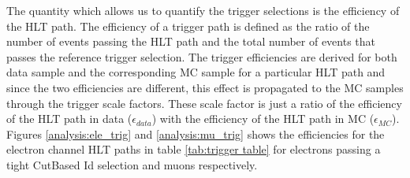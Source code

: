 The quantity which allows us to quantify the trigger selections is the efficiency of the HLT path. The efficiency of a trigger path is defined as the ratio of the number of events passing the HLT path and the total number of events that passes the reference trigger selection. The trigger efficiencies are derived for both data sample and the corresponding MC sample for a particular HLT path and since the two efficiencies are different, this effect is propagated to the MC samples through the trigger scale factors. These scale factor is just a ratio of the efficiency of the HLT path in data ($\epsilon_{data}$) with the efficiency of the HLT path in MC ($\epsilon_{MC}$). Figures \ref{analysis:ele_trig} and \ref{analysis:mu_trig} shows the efficiencies for the electron channel HLT paths in table \ref{tab:trigger table} for electrons passing a tight CutBased Id selection and muons respectively.
